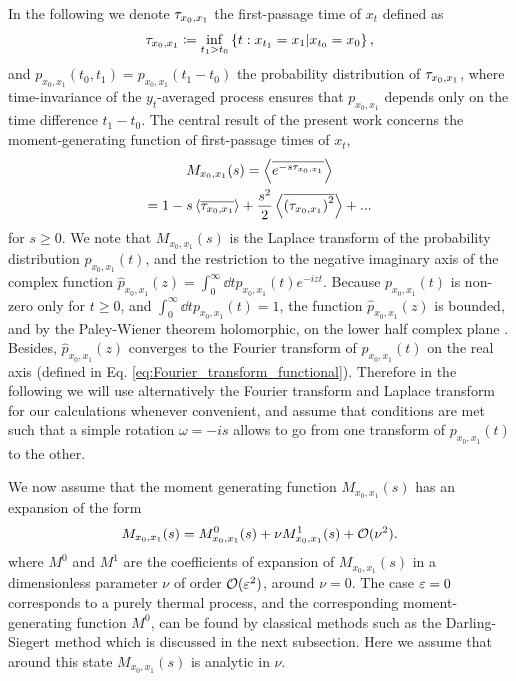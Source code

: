 \documentclass[%
 reprint,
superscriptaddress,
nofootinbib,
 amsmath,amssymb,
 aps,
prx,
]{revtex4-2}
\begin{document}
In the following we denote  $\tau_{x_0,x_1}$ the first-passage time of $x_t$ defined as
\begin{align}
    \tau_{x_0,x_1} \coloneqq \inf_{t_1>t_0} \left\{ t: x_{ t_1} = x_1 | x_{t_0} = x_0  \right\},
\end{align}
and $p_{x_0, x_1}(t_0,t_1)=p_{x_0, x_1} (t_1-t_0)$ the probability distribution of $\tau_{x_0,x_1}$, where time-invariance of the $y_t$-averaged process ensures that $p_{x_0, x_1}$ depends only on the time difference $t_1-t_0$.
The central result of the present work concerns the moment-generating function of first-passage times of $x_t$, 
\begin{multline}
   M_{x_0, x_1}(s)= \left\langle {\overline{e^{-s \tau_{x_0,x_1}}}} \right\rangle \\
    = 1 - s \left\langle {\overline{\tau_{x_0,x_1}}} \right\rangle + \frac{s^2}{2}\left\langle {\overline{\left(\tau_{x_0,x_1}\right)^2}} \right\rangle + ...
\end{multline}
for $s\geq 0$. We note that $M_{x_0, x_1} (s)$ is the Laplace transform of the probability distribution $p_{x_0, x_1}(t)$, and the restriction to the negative imaginary axis of the complex function $\hat{p}_{x_0,x_1}(z)=\int_0^{\infty} \dd{t} p_{x_0,x_1}(t) e^{-i z t}$. Because $p_{x_0, x_1} (t)$ is non-zero only for $t\geq 0$, and $\int_0^{\infty} \dd t p_{x_0, x_1} (t)=1$, the function $\hat{p}_{x_0, x_1} (z)$ is bounded, and by the Paley-Wiener theorem holomorphic, on the lower half complex plane \cite{Hoermander1963}. Besides, $\hat{p}_{x_0, x_1} (z)$ converges to the Fourier transform of $p_{x_0, x_1} (t)$ on the real axis (defined in Eq. \ref{eq:Fourier_transform_functional}). Therefore in the following we will use alternatively the Fourier transform and Laplace transform for our calculations whenever convenient, and assume that conditions are met such that a simple rotation $\omega=-is$ allows to go from one transform of $p_{x_0, x_1}(t)$ to the other.

We now assume that the moment generating function $M_{x_0, x_1}(s)$ has an expansion of the form
\begin{align}
    M_{x_0, x_1} (s)= M^0_{x_0,x_1} (s) + \nu M^1_{x_0,x_1}(s) + \mathcal{O}(\nu^2).
    \label{eq:general_f_structure}
\end{align}
where $M^0$ and $M^1$ are the coefficients of expansion of $M_{x_0, x_1} (s)$ in a dimensionless parameter $\nu$ of order $\mathcal{O}(\varepsilon^2)$, around $\nu = 0$. The case $\varepsilon = 0$ corresponds to a purely thermal process, and the corresponding moment-generating function $M^0$, can be found by classical methods such as the Darling-Siegert method which is discussed in the next subsection. Here we assume that around this state $M_{x_0, x_1} (s)$ is analytic in $\nu$. 
\end{document}
